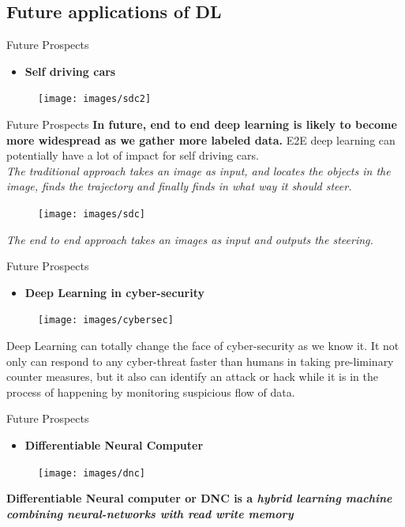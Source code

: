 \documentclass[10pt]{beamer}
\begin{document}
	\subsection{Future applications of DL}
	\begin{frame}[c]{Future Prospects}
		\begin{itemize}
			\item \large{\textbf{Self driving cars}}
		\end{itemize}
		\begin{figure}
			\texttt{[image: images/sdc2]}
		\end{figure}
	\end{frame}
	\begin{frame}[c]{Future Prospects}
		\textbf{In future, end to end deep learning is likely to become more widespread as we gather more labeled data.} E2E deep learning can potentially have a lot of impact for self driving cars.\\
		\textit{The traditional approach takes an image as input, and locates the objects in the image, finds the trajectory and finally finds in what way it should steer.}
		\begin{figure}
			\texttt{[image: images/sdc]}
		\end{figure}
		\textit{The end to end approach takes an images as input and outputs the steering.}
	\end{frame}
	\begin{frame}[c]{Future Prospects}
		\begin{itemize}
			\item \large{\textbf{Deep Learning in cyber-security}}
		\end{itemize}
		\begin{figure}
			\texttt{[image: images/cybersec]}
		\end{figure}
		Deep Learning can totally change the face of cyber-security as we know it. It not only can respond to any cyber-threat faster than humans in taking pre-liminary counter measures, but it also can identify an attack or hack while it is in the process of happening by monitoring suspicious flow of data.
	\end{frame}
	\begin{frame}[c]{Future Prospects}
		\begin{itemize}
			\item \large{\textbf{Differentiable Neural Computer}}
		\end{itemize}
		\begin{figure}
			\texttt{[image: images/dnc]}
		\end{figure}
		\textbf{Differentiable Neural computer or DNC is a \textit{hybrid learning machine \alert{combining neural-networks with read write memory}}}
	\end{frame}
\end{document}

